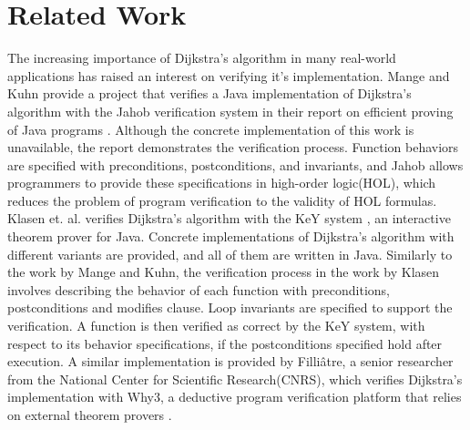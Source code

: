 
\section{Related Work}
The increasing importance of Dijkstra's algorithm in many real-world applications has raised an interest on verifying it's implementation. Mange and Kuhn provide a project that verifies a Java implementation of Dijkstra's algorithm with the Jahob verification system in their report on efficient proving of Java programs \cite{Mange}. Although the concrete implementation of this work is unavailable, the report demonstrates the verification process. Function behaviors are specified with preconditions, postconditions, and invariants, and Jahob allows programmers to provide these specifications in high-order logic(HOL), which reduces the problem of program verification to the validity of HOL formulas. 
\\

Klasen et. al. verifies Dijkstra's algorithm with the KeY system \cite{Klasen}, an interactive theorem prover for Java. Concrete implementations of Dijkstra's algorithm with different variants are provided, and all of them are written in Java. Similarly to the work by Mange and Kuhn, the verification process in the work by Klasen involves describing the behavior of each function with preconditions, postconditions and modifies clause. Loop invariants are specified to support the verification. A function is then verified as correct by the KeY system, with respect to its behavior specifications, if the postconditions specified hold after execution. A similar implementation is provided by Filliâtre, a senior researcher from the National Center for Scientific Research(CNRS), which verifies Dijkstra's implementation with Why3, a deductive program verification platform that relies on external theorem provers \cite{Jean}\cite{why3}. 
\\

